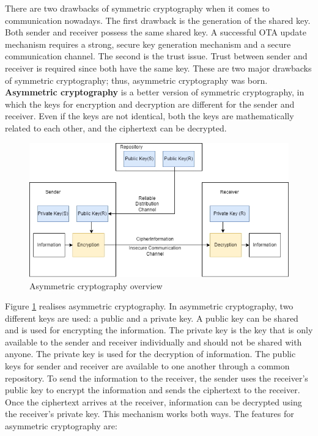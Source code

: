 \documentclass[12pt,a4paper]{article}
\begin{document}
There are two drawbacks of symmetric cryptography when it comes to communication nowadays. The first drawback is the generation of the shared key. Both sender and receiver possess the same shared key. A successful OTA update mechanism requires a strong, secure key generation mechanism and a secure communication channel. The second is the trust issue. Trust between sender and receiver is required since both have the same key. These are two major drawbacks of symmetric cryptography; thus, asymmetric cryptography was born. \cite{r23} \\

\textbf{Asymmetric cryptography} is a better version of symmetric cryptography, in which the keys for encryption and decryption are different for the sender and receiver. Even if the keys are not identical, both the keys are mathematically related to each other, and the ciphertext can be decrypted. \cite{r23}


\begin{figure}[H]
\centering
\includegraphics[scale=0.65]{asymmetric_cryptography.PNG}
\caption{Asymmetric cryptography overview \cite{r23}}
\label{asymmetric_cryptography}
\end{figure}

Figure \ref{asymmetric_cryptography} realises asymmetric cryptography. In asymmetric cryptography, two different keys are used: a public and a private key. A public key can be shared and is used for encrypting the information. The private key is the key that is only available to the sender and receiver individually and should not be shared with anyone. The private key is used for the decryption of information. The public keys for sender and receiver are available to one another through a common repository. To send the information to the receiver, the sender uses the receiver's public key to encrypt the information and sends the ciphertext to the receiver. Once the ciphertext arrives at the receiver, information can be decrypted using the receiver's private key. This mechanism works both ways. The features for asymmetric cryptography are: \cite{r23}
\end{document}
